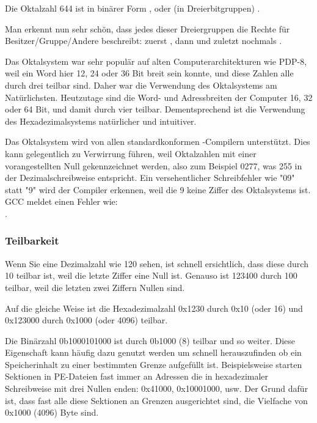 Die Oktalzahl 644 ist in binärer Form , oder (in Dreierbitgruppen) .

Man erkennt nun sehr schön, dass jedes dieser Dreiergruppen die Rechte für Besitzer/Gruppe/Andere beschreibt:
zuerst  , dann  und zuletzt nochmals .

Das Oktalsystem war sehr populär auf alten Computerarchitekturen wie PDP-8, weil ein Word hier 12, 24 oder 36 Bit breit sein konnte,
und diese Zahlen alle durch drei teilbar sind. Daher war die Verwendung des Oktalsystems am Natürlichsten.
Heutzutage sind die Word- und Adressbreiten der Computer 16, 32 oder 64 Bit, und damit durch vier teilbar. Dementsprechend ist die
Verwendung des Hexadezimalsystems natürlicher und intuitiver.

Das Oktalsystem wird von allen standardkonformen \CCpp-Compilern unterstützt.
Dies kann gelegentlich zu Verwirrung führen, weil Oktalzahlen mit einer vorangestellten Null gekennzeichnet werden,
also zum Beispiel 0277, was 255 in der Dezimalschreibweise entspricht.
Ein versehentlicher Schreibfehler wie "09" statt "9" wird der Compiler erkennen, weil die 9 keine Ziffer des Oktalsystems ist.
GCC meldet einen Fehler wie:\\
.

\subsubsection{Teilbarkeit}

Wenn Sie eine Dezimalzahl wie 120 sehen, ist schnell ersichtlich, dass diese durch 10 teilbar ist, weil die letzte Ziffer eine Null ist.
Genauso ist 123400 durch 100 teilbar, weil die letzten zwei Ziffern Nullen sind.

Auf die gleiche Weise ist die Hexadezimalzahl 0x1230 durch 0x10 (oder 16) und 0x123000 durch 0x1000 (oder 4096) teilbar.

Die Binärzahl 0b1000101000 ist durch 0b1000 (8) teilbar und so weiter.
Diese Eigenschaft kann häufig dazu genutzt werden um schnell herauszufinden ob ein Speicherinhalt zu einer bestimmten Grenze
aufgefüllt ist. Beispielsweise starten Sektionen in \ac{PE}-Dateien fast immer an Adressen die in hexadezimaler Schreibweise
mit drei Nullen enden: 0x41000, 0x10001000, usw.
Der Grund dafür ist, dass fast alle diese Sektionen an Grenzen ausgerichtet sind, die Vielfache von 0x1000 (4096) Byte sind.

